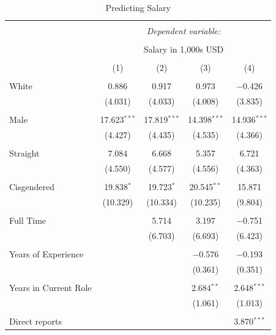 \documentclass[12pt]{article}         %
\begin{document}
\begin{table}[!htbp] \centering 
  \caption{Predicting Salary} 
  \label{} 
\begin{tabular}{@{\extracolsep{5pt}}lcccc} 
\\[-1.8ex]\hline 
\hline \\[-1.8ex] 
 & \multicolumn{4}{c}{\textit{Dependent variable:}} \\ 
\cline{2-5} 
\\[-1.8ex] & \multicolumn{4}{c}{Salary in 1,000s USD} \\ 
\\[-1.8ex] & (1) & (2) & (3) & (4)\\ 
\hline \\[-1.8ex] 
 White & 0.886 & 0.917 & 0.973 & $-$0.426 \\ 
  & (4.031) & (4.033) & (4.008) & (3.835) \\ 
  & & & & \\ 
 Male & 17.623$^{***}$ & 17.819$^{***}$ & 14.398$^{***}$ & 14.936$^{***}$ \\ 
  & (4.427) & (4.435) & (4.535) & (4.366) \\ 
  & & & & \\ 
 Straight & 7.084 & 6.668 & 5.357 & 6.721 \\ 
  & (4.550) & (4.577) & (4.556) & (4.363) \\ 
  & & & & \\ 
 Cisgendered & 19.838$^{*}$ & 19.723$^{*}$ & 20.545$^{**}$ & 15.871 \\ 
  & (10.329) & (10.334) & (10.235) & (9.804) \\ 
  & & & & \\ 
 Full Time &  & 5.714 & 3.197 & $-$0.751 \\ 
  &  & (6.703) & (6.693) & (6.423) \\ 
  & & & & \\ 
 Years of Experience &  &  & $-$0.576 & $-$0.193 \\ 
  &  &  & (0.361) & (0.351) \\ 
  & & & & \\ 
 Years in Current Role &  &  & 2.684$^{**}$ & 2.648$^{***}$ \\ 
  &  &  & (1.061) & (1.013) \\ 
  & & & & \\ 
 Direct reports &  &  &  & 3.870$^{***}$ \\ 

\end{tabular}
\end{table}
\end{document}
